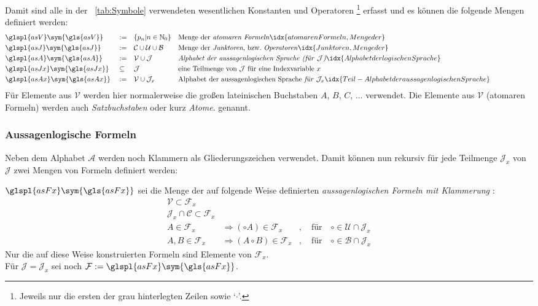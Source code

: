\documentclass[english,ngerman,parskip=half,headsepline,footsepline,
	fleqn,notitlepage]{scrreprt}
\makeatletter
\newcommand*{\metaimp}{\Rightarrow}%
\newcommand*{\defeq}{:=}%
\newcommand*{\lmult}{\cdot}
\newcommand*{\gsNo}{\mathbb{N}_0}%
\newcommand*{\asA}{\mathcal{A}}%
\newcommand*{\asB}{\mathcal{B}}%
\newcommand*{\asC}{\mathcal{C}}%
\newcommand*{\asF}{\mathcal{F}}%
\newcommand*{\asFx}{\mathcal{F}_x}%
\newcommand*{\asJ}{\mathcal{J}}%
\newcommand*{\asJx}{\mathcal{J}_x}%
\newcommand*{\asU}{\mathcal{U}}%
\newcommand*{\asV}{\mathcal{V}}%
\newcommand*{\formulatoleft}{&&&&&&&&&&}%
\newcommand*{\charqt}[1]{\enquote*{#1}}%
\newcommand*{\symqt}[1]{\charqt{#1}}%
\newcommand*{\textbzw}{bzw.\@ }
\newcommand*{\Idx}[1]{#1\idx{#1}}%
\newcommand*{\glsSym}[1]{\glspl{#1}\sym{\gls{#1}}}%
\makeatother
\begin{document}
	Damit sind alle in der \tablename~\vref{tab:Symbole} verwendeten
	wesentlichen Konstanten und Operatoren%
	\footnote{%
		Jeweils nur die ersten der grau hinterlegten Zeilen sowie \symqt{$\lmult$}.%
	}
	erfasst und es können die folgende Mengen definiert werden:
	\begin{align}
		& \glsSym{asV}  & & \defeq    & & \{ p_n | n \in \gsNo \}
		& & \text{Menge der \emph{atomaren Formeln}}
		\idx{atomaren Formeln, Menge der}         \label{def:V}  \\
		& \glsSym{asJ}  & & \defeq    & &\asC \cup \asU \cup \asB
		& & \text{Menge der \emph{Junktoren}, \textbzw \emph{Operatoren}}
		\idx{Junktoren, Menge der}                \label{def:J}  \\
		& \glsSym{asA}  & & \defeq    & & \asV \cup \asJ
		& & \text{\emph{Alphabet der aussagenlogischen Sprache (für }} \asJ
		\text{\emph{)}}
		\idx{Alphabet der logischen Sprache}      \label{def:A}  \\
		& \glsSym{asJx} & & \subseteq & & \asJ
		& & \text{eine Teilmenge von } \asJ \text{ für eine Indexvariable }
		x                                         \label{def:Bx} \\
		& \glsSym{asAx} & & \defeq    & & \asV \cup \asJx \quad
		& & \text{Alphabet der aussagenlogischen Sprache \emph{für} } \asJx
		\idx{Teil-Alphabet der aussagenlogischen Sprache} \label{def:Ax}
		\formulatoleft
	\end{align}
	Für Elemente aus $\asV$ werden hier normalerweise
	die großen lateinischen Buchstaben $A$, $B$, $C$, $\dots$ verwendet.
	Die Elemente aus $\asV$ (atomaren Formeln) werden auch \emph{\Idx{Satzbuchstabe}}\emph{n}
	oder kurz \emph{\Idx{Atom}}\emph{e}. genannt.

	\subsubsection{Aussagenlogische Formeln}%
	\label{subsub:Formeln}

	Neben dem Alphabet $\asA$
	werden noch Klammern als Gliederungszeichen verwendet.
	Damit können nun rekursiv für jede Teilmenge $\asJx$ von $\asJ$
	zwei Mengen von Formeln definiert werden:

	$\glsSym{asFx}$ sei die Menge der auf folgende Weise definierten
	\emph{aussagenlogischen Formeln mit Klammerung}%
	:
	\begin{align}
		\asV            \subset    \asFx
		\\
		\asJx \cap \asC \subset    \asFx
		\\
		A                      \in \asFx
		& \metaimp (\circ A)   \in \asFx
		& , \quad \text{für} \quad \circ \in \asU \cap \asJx
		\\
		A, B            \in        \asFx
		& \metaimp (A \circ B) \in \asFx
		& , \quad \text{für} \quad \circ \in \asB \cap \asJx
	\end{align}
	Nur die auf diese Weise konstruierten Formeln sind Elemente von $\asFx$.
	\\Für $\asJ = \asJx$ sei noch $\asF \defeq \glsSym{asFx}$.
\end{document}
